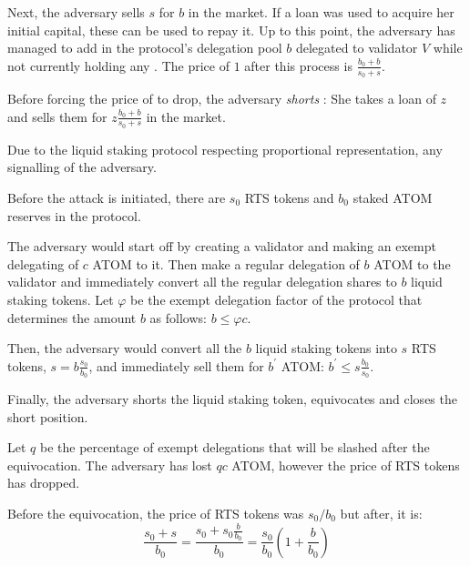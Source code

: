 Next, the adversary sells $s$ \stasset for $b$ \asset in the market.
If a loan was used to acquire her initial capital,
these \asset can be used to repay it.
Up to this point, the adversary
has managed to add in the protocol's delegation pool $b$
\asset delegated to validator $V$ while not currently holding
any \stasset. The price of $1$ \stasset after this process
is $\frac{b_0 + b}{s_0 + s}$.

Before forcing the price of \stasset to drop, the adversary \emph{shorts}
\stasset: She takes a loan of $z$ \stasset and sells them for
$z \frac{b_0 + b}{s_0 + s}$ \asset in the market.


Due to the liquid staking protocol respecting proportional
representation, any signalling of the adversary.

Before the attack is initiated, there are $s_0$ RTS tokens and $b_0$
staked ATOM reserves in the protocol.

The adversary would start off by creating a validator and making an
exempt delegating of $c$ ATOM to it.
Then make a regular delegation of $b$ ATOM to the validator and
immediately convert all the regular delegation shares to $b$ liquid
staking tokens.
Let $\varphi$ be the exempt delegation factor of the protocol
that determines the amount $b$ as follows: $b \leq \varphi c$.

Then, the adversary would convert all the $b$ liquid staking tokens into
$s$ RTS tokens, $s = b \frac{s_0}{b_0}$, and immediately sell them for
$b^{'}$ ATOM: $b^{'} \leq s \frac{b_0}{s_0}$.

Finally, the adversary shorts the liquid staking token, equivocates
and closes the short position.

Let $q$ be the percentage of exempt delegations that will be slashed after
the equivocation. The adversary has lost $qc$ ATOM, however the price of RTS
tokens has dropped.

Before the equivocation, the price of RTS tokens was $s_0/b_0$ but
after, it is:
\[
\frac{s_0 + s}{b_0} =
\frac{s_0 + s_0\frac{b}{b_0}}{b_0} =
\frac{s_0}{b_0} (1 + \frac{b}{b_0})
\]

